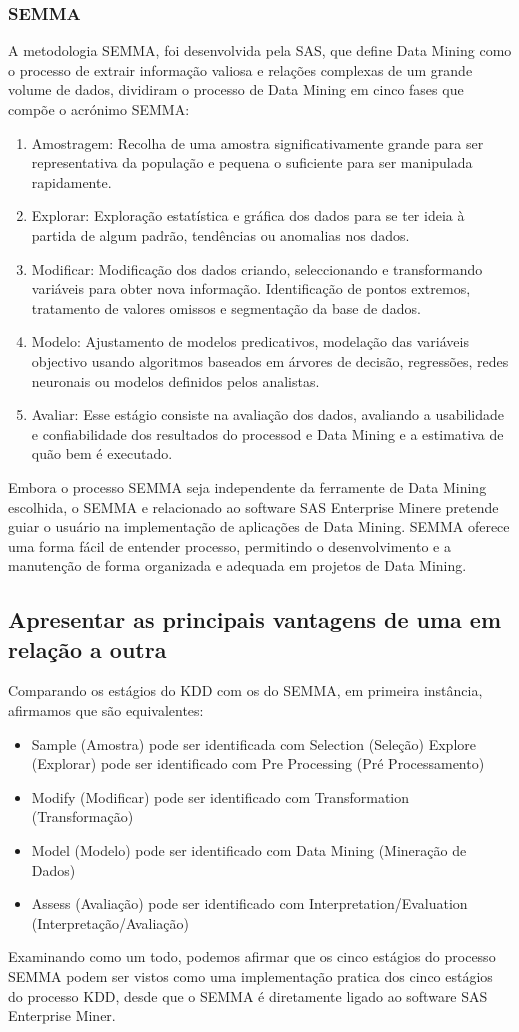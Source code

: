 \documentclass{article}
\begin{document}
\subsubsection{SEMMA}
A metodologia SEMMA, foi desenvolvida pela SAS, que define Data Mining como o processo de extrair informação valiosa e relações complexas de um grande volume de dados, dividiram o processo de Data Mining em cinco fases que compõe o acrónimo SEMMA:
\begin{enumerate}
    \item Amostragem: Recolha de uma amostra significativamente grande para ser representativa da população e pequena o suficiente para ser manipulada rapidamente.
    \item Explorar: Exploração estatística e gráfica dos dados para se ter ideia à partida de algum padrão, tendências ou anomalias nos dados.
    \item Modificar: Modificação dos dados criando, seleccionando e transformando variáveis para obter nova informação. Identificação de pontos extremos, tratamento de valores omissos e segmentação da base de dados.
    \item Modelo: Ajustamento de modelos predicativos, modelação das variáveis objectivo usando algoritmos baseados em árvores de decisão, regressões, redes neuronais ou modelos definidos pelos analistas.
    \item Avaliar: Esse estágio consiste na avaliação dos dados, avaliando a usabilidade e confiabilidade dos resultados do processod e Data Mining e a estimativa de quão bem é executado.
\end{enumerate}
\noindent
Embora o processo SEMMA seja independente da ferramente de Data Mining escolhida, o SEMMA e relacionado ao software SAS Enterprise Minere pretende guiar o usuário na implementação de aplicações de Data Mining. SEMMA oferece uma forma fácil de entender processo, permitindo o desenvolvimento e a manutenção de forma organizada e adequada em projetos de Data Mining.
\subsection{Apresentar as principais vantagens de uma em relação a outra}
Comparando os estágios do KDD com os do SEMMA, em primeira instância, afirmamos que são equivalentes:
\begin{itemize}
    \item Sample (Amostra) pode ser identificada com Selection (Seleção)
    Explore (Explorar) pode ser identificado com Pre Processing (Pré Processamento)
    \item Modify (Modificar) pode ser identificado com Transformation (Transformação)
    \item Model (Modelo) pode ser identificado com Data Mining (Mineração de Dados)
    \item Assess (Avaliação) pode ser identificado com Interpretation/Evaluation (Interpretação/Avaliação)
\end{itemize}
\noindent
Examinando como um todo, podemos afirmar que os cinco estágios do processo SEMMA podem ser vistos como uma implementação pratica dos cinco estágios do processo KDD, desde que o SEMMA é diretamente ligado ao software SAS Enterprise Miner.
\end{document}
